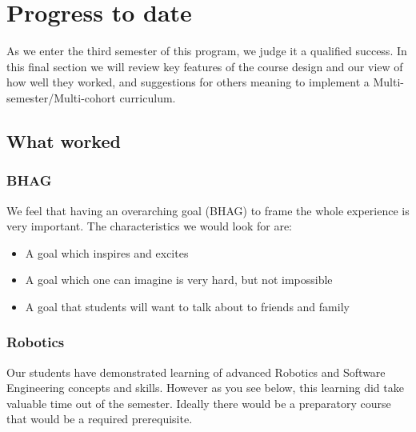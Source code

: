 \section{Progress to date}
As we enter the third semester of this program, we judge it a qualified success. In this final section we will review key features of the course design and our view of how well they worked, and suggestions for others meaning to implement a Multi-semester/Multi-cohort curriculum.
\subsection{What worked}
\subsubsection{BHAG}
We feel that having an overarching goal (BHAG) to frame the whole experience is very important. The characteristics we would look for are:
\begin{itemize}
\item A goal which inspires and excites
\item A goal which one can imagine is very hard, but not impossible
\item A goal that students will want to talk about to friends and family
\end{itemize}

\subsubsection{Robotics} Our students have demonstrated learning of advanced Robotics and Software Engineering concepts and skills. However as you see below, this learning did take valuable time out of the semester. Ideally there would be a preparatory course that would be a required prerequisite.
